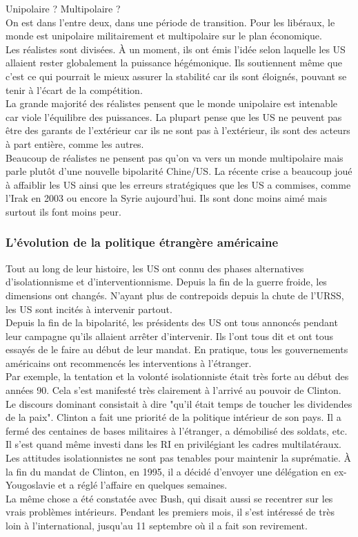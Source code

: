 \documentclass[10pt, a4paper, openany]{book}
\begin{document}
Unipolaire ? Multipolaire ? \\
On est dans l'entre deux, dans une période de transition. Pour les libéraux, le monde est unipolaire militairement et multipolaire sur le plan économique. \\
Les réalistes sont divisées. À un moment, ils ont émis l'idée selon laquelle les US allaient rester globalement la puissance hégémonique. Ils soutiennent même que c'est ce qui pourrait le mieux assurer la stabilité car ils sont éloignés, pouvant se tenir à l'écart de la compétition. \\
La grande majorité des réalistes pensent que le monde unipolaire est intenable car viole l'équilibre des puissances. La plupart pense que les US ne peuvent pas être des garants de l'extérieur car ils ne sont pas à l'extérieur, ils sont des acteurs à part entière, comme les autres. \\
Beaucoup de réalistes ne pensent pas qu'on va vers un monde multipolaire mais parle plutôt d'une nouvelle bipolarité Chine/US. La récente crise a beaucoup joué à affaiblir les US ainsi que les erreurs stratégiques que les US a commises, comme l'Irak en 2003 ou encore la Syrie aujourd'hui. Ils sont donc moins aimé mais surtout ils font moins peur.

\subsubsection{L'évolution de la politique étrangère américaine}

Tout au long de leur histoire, les US ont connu des phases alternatives d'isolationnisme et d'interventionnisme. Depuis la fin de la guerre froide, les dimensions ont changés. N'ayant plus de contrepoids depuis la chute de l'URSS, les US sont incités à intervenir partout. \\
Depuis la fin de la bipolarité, les présidents des US ont tous annoncés pendant leur campagne qu'ils allaient arrêter d'intervenir. Ils l'ont tous dit et ont tous essayés de le faire au début de leur mandat. En pratique, tous les gouvernements américains ont recommencés les interventions à l'étranger. \\
Par exemple, la tentation et la volonté isolationniste était très forte au début des années 90. Cela s'est manifesté très clairement à l'arrivé au pouvoir de Clinton. Le discours dominant consistait à dire "qu'il était temps de toucher les dividendes de la paix". Clinton a fait une priorité de la politique intérieur de son pays. Il a fermé des centaines de bases militaires à l'étranger, a démobilisé des soldats, etc. Il s'est quand même investi dans les RI en privilégiant les cadres multilatéraux. \\
Les attitudes isolationnistes ne sont pas tenables pour maintenir la suprématie. À la fin du mandat de Clinton, en 1995, il a décidé d'envoyer une délégation en ex-Yougoslavie et a réglé l'affaire en quelques semaines. \\
La même chose a été constatée avec Bush, qui disait aussi se recentrer sur les vrais problèmes intérieurs. Pendant les premiers mois, il s'est intéressé de très loin à l'international, jusqu'au 11 septembre où il a fait son revirement. 
\end{document}
